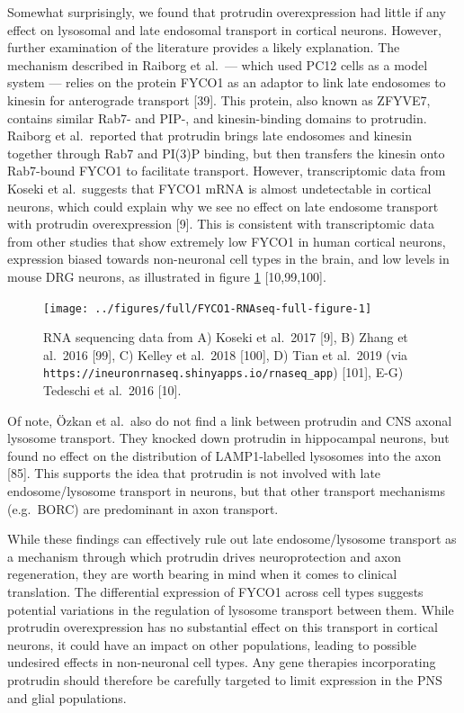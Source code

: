 \documentclass[
  12pt,
  a4paper,
]{book}
\begin{document}
Somewhat surprisingly, we found that protrudin overexpression had little if any effect on lysosomal and late endosomal transport in cortical neurons. However, further examination of the literature provides a likely explanation. The mechanism described in Raiborg et al.~--- which used PC12 cells as a model system --- relies on the protein FYCO1 as an adaptor to link late endosomes to kinesin for anterograde transport {[}39{]}. This protein, also known as ZFYVE7, contains similar Rab7- and PIP-, and kinesin-binding domains to protrudin. Raiborg et al.~reported that protrudin brings late endosomes and kinesin together through Rab7 and PI(3)P binding, but then transfers the kinesin onto Rab7-bound FYCO1 to facilitate transport. However, transcriptomic data from Koseki et al.~suggests that FYCO1 mRNA is almost undetectable in cortical neurons, which could explain why we see no effect on late endosome transport with protrudin overexpression {[}9{]}. This is consistent with transcriptomic data from other studies that show extremely low FYCO1 in human cortical neurons, expression biased towards non-neuronal cell types in the brain, and low levels in mouse DRG neurons, as illustrated in figure \ref{fig:FYCO1-RNAseq-full-figure} {[}10,99,100{]}.



\begin{figure}
\texttt{[image: ../figures/full/FYCO1-RNAseq-full-figure-1]} \caption[FYCO1 transcriptome comparisons]{RNA sequencing data from A) Koseki et al.~2017 {[}9{]}, B) Zhang et al.~2016 {[}99{]}, C) Kelley et al.~2018 {[}100{]}, D) Tian et al.~2019 (via \texttt{https://ineuronrnaseq.shinyapps.io/rnaseq\_app}) {[}101{]}, E-G) Tedeschi et al.~2016 {[}10{]}.}\label{fig:FYCO1-RNAseq-full-figure}
\end{figure}

Of note, Özkan et al.~also do not find a link between protrudin and CNS axonal lysosome transport. They knocked down protrudin in hippocampal neurons, but found no effect on the distribution of LAMP1-labelled lysosomes into the axon {[}85{]}. This supports the idea that protrudin is not involved with late endosome/lysosome transport in neurons, but that other transport mechanisms (e.g.~BORC) are predominant in axon transport.

While these findings can effectively rule out late endosome/lysosome transport as a mechanism through which protrudin drives neuroprotection and axon regeneration, they are worth bearing in mind when it comes to clinical translation. The differential expression of FYCO1 across cell types suggests potential variations in the regulation of lysosome transport between them. While protrudin overexpression has no substantial effect on this transport in cortical neurons, it could have an impact on other populations, leading to possible undesired effects in non-neuronal cell types. Any gene therapies incorporating protrudin should therefore be carefully targeted to limit expression in the PNS and glial populations.
\end{document}
